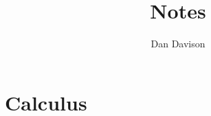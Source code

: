 \documentclass{book}
\title{Notes}
\author{Dan Davison}
\begin{document}
\frontmatter
\maketitle
\tableofcontents
\mainmatter
\chapter{Calculus}

\end{document}
